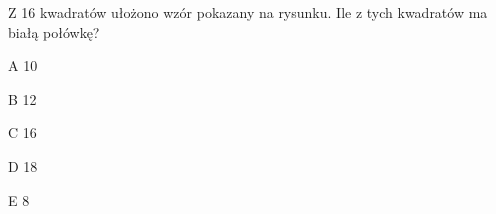 \begin{tresc}
Z 16 kwadratów ułożono wzór pokazany na rysunku. Ile z tych kwadratów ma białą połówkę?
\end{tresc}
\begin{wariant}{A} 10 \end{wariant}
\begin{wariant}{B} 12 \end{wariant}
\begin{wariant}{C} 16 \end{wariant}
\begin{wariant}{D} 18 \end{wariant}
\begin{wariant}{E} 8 \end{wariant}
